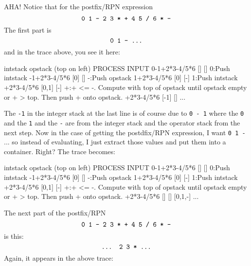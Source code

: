 AHA!
Notice that for the postfix/RPN expression
\[
\text{\texttt{0 1 - 2 3 * + 4 5 / 6 * -}} 
\]
The first part is
\[
\text{\texttt{0 1 - ...}} 
\]
and in the trace above, you see it here:
{\scriptsize
\begin{console}
              intstack opstack (top on left)
                              PROCESS INPUT
0-1+2*3-4/5*6 []       []
                              0:Push intstack
 -1+2*3-4/5*6 [0]      []
                              -:Push opstack
  1+2*3-4/5*6 [0]      [-]
                              1:Push intstack
   +2*3-4/5*6 [0,1]    [-]
                              +:+ <= -. Compute with top of
                                opstack until opstack empty or
                                + > top.
                                Then push + onto opstack.
   +2*3-4/5*6 [-1]     []
...
\end{console}
}
The \texttt{-1} in the integer stack at the last line
is of course due to
\texttt{0 - 1} where the \texttt{0} and the \texttt{1} and the \texttt{-}
are from the integer stack and the operator stack
from the next step.
Now in the case of getting the postdfix/RPN expression,
I want \texttt{0 1 -} ... so instead of evaluating,
I just extract those values and put them into a container.
Right?
The trace becomes:
{\scriptsize
\begin{console}
              intstack opstack (top on left)
                              PROCESS INPUT
0-1+2*3-4/5*6 []       []
                              0:Push intstack
 -1+2*3-4/5*6 [0]      []
                              -:Push opstack
  1+2*3-4/5*6 [0]      [-]
                              1:Push intstack
   +2*3-4/5*6 [0,1]    [-]
                              +:+ <= -. Compute with top of
                                opstack until opstack empty or
                                + > top.
                                Then push + onto opstack.
   +2*3-4/5*6 []       []
              [0,1,-]
...
\end{console}
}
The next part of the postfix/RPN
\[
\text{\texttt{0 1 - 2 3 * + 4 5 / 6 * -}} 
\]
is this:
\[
\text{\texttt{... 2 3 * ...}} 
\]
Again, it appears in the above trace:
